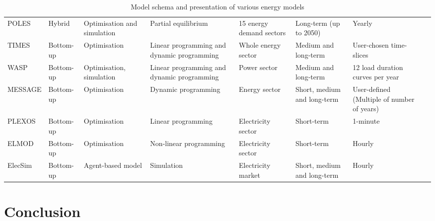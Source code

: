 \begin{table}[]
\begin{tabular}{@{}p{2cm}p{2cm}p{2cm}p{2cm}p{2cm}p{2cm}p{2cm}p{2cm}}
		POLES          & Hybrid                       & Optimisation and simulation                       & Partial equilibrium                              & 15 energy demand sectors   & Long-term (up to 2050)           & Yearly                                              \\
		TIMES          & Bottom-up                    & Optimisation                                      & Linear programming and dynamic programming       & Whole energy sector        & Medium and long-term             & User-chosen time-slices                             \\
		WASP           & Bottom-up                    & Optimisation, simulation                          & Linear programming and dynamic programming       & Power sector               & Medium and long-term             & 12 load duration curves per year                    \\
		MESSAGE        & Bottom-up                    & Optimisation                                      & Dynamic programming                              & Energy sector              & Short, medium and long-term      & User-defined (Multiple of number of years)          \\
		PLEXOS         & Bottom-up                    & Optimisation                                      & Linear programming                               & Electricity sector         & Short-term                       & 1-minute                                            \\
		ELMOD          & Bottom-up                    & Optimisation                                      & Non-linear programming                           & Electricity sector         & Short-term                       & Hourly                                              \\ 
		ElecSim        & Bottom-up                    & Agent-based model                                 & Simulation                                       & Electricity market         & Short, medium and long-term      & Hourly                                              \\ \bottomrule	\end{tabular}
	\caption{Model schema and presentation of various energy models \cite{Hall2016a}}
	\label{tab:litreview:modelreview}
\end{table} 


\section{Conclusion}
\label{sec:litreview:conclusion}

